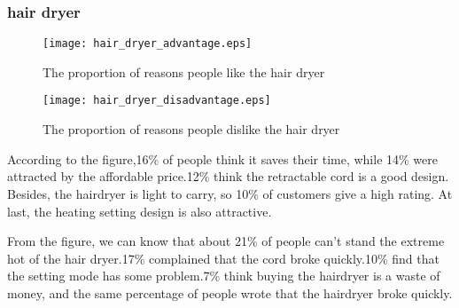 \documentclass{mcmthesis}
\begin{document}
\subsubsection{hair dryer}
\begin{figure}[H]
	\begin{minipage}[t]{0.5\textwidth}
		\centering
		\texttt{[image: hair\_dryer\_advantage.eps]}
		\caption{The proportion of reasons people like the hair dryer}
	\end{minipage}
	\qquad
	\begin{minipage}[t]{0.5\textwidth}
		\centering
		\texttt{[image: hair\_dryer\_disadvantage.eps]}
		\caption{The proportion of reasons people dislike the hair dryer }
	\end{minipage}
\end{figure}
\begin{flushleft}
	According to the figure,16\% of people think it saves their time, while 14\% were attracted by the affordable price.12\% think the retractable cord is a good design. Besides, the hairdryer is light to carry, so 10\% of customers give a high rating. At last, the heating setting design is also attractive.
\end{flushleft}
\begin{flushleft}
	From the figure, we can know that about 21\% of people can't stand the extreme hot of the hair dryer.17\% complained that the cord broke quickly.10\% find that the setting mode has some problem.7\% think buying the hairdryer is a waste of money, and the same percentage of people wrote that the hairdryer broke quickly.
\end{flushleft}
\end{document}
